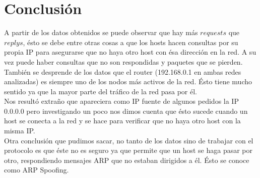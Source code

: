 \documentclass{article}
\begin{document}
\section{Conclusión}
A partir de los datos obtenidos se puede observar que hay más $requests$ que
$replys$, ésto se debe entre otras cosas a que los hosts hacen consultas por
su propia IP para asegurarse que no haya otro host con ésa dirección en la
red. A su vez puede haber consultas que no son respondidas y paquetes que se
pierden.\\ 
También se desprende de los datos que el router (192.168.0.1 en ambas redes analizadas)
es siempre uno de los nodos más activos de la red. Ésto tiene mucho sentido ya que la mayor parte del tráfico de la red pasa por él.\\
Nos resultó extraño que apareciera como IP fuente de algunos
pedidos la IP 0.0.0.0 pero investigando un poco nos dimos cuenta que ésto
sucede cuando un host se conecta a la red y se hace para verificar que no haya
otro host con la misma IP.\\
Otra conclusión que pudimos sacar, no tanto de los datos sino de trabajar con el protocolo
es que éste no es seguro ya que permite que un host se haga pasar por otro,
respondiendo mensajes ARP que no estaban dirigidos a él. Ésto se conoce como ARP Spoofing.
\end{document}
